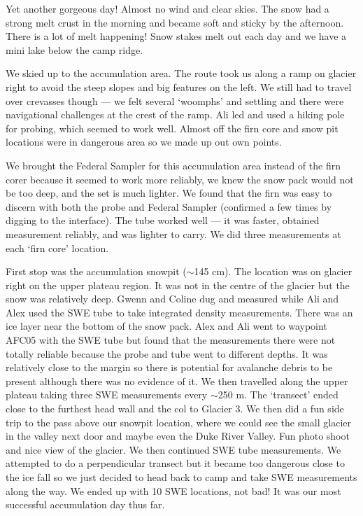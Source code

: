 \documentclass[12pt]{article}
\begin{document}
Yet another gorgeous day! Almost no wind and clear skies. The snow had a strong melt crust in the morning and became soft and sticky by the afternoon. There is a lot of melt happening! Snow stakes melt out each day and we have a mini lake below the camp ridge. 

We skied up to the accumulation area.  The route took us along a ramp on glacier right to avoid the steep slopes and big features on the left. We still had to travel over crevasses though --- we felt several `woomphs' and settling and there were navigational challenges at the crest of the ramp. Ali led and used a hiking pole for probing, which seemed to work well. Almost off the firn core and snow pit locations were in dangerous area so we made up out own points.

We brought the Federal Sampler for this accumulation area instead of the firn corer because it seemed to work more reliably, we knew the snow pack would not be too deep, and the set is much lighter.  We found that the firn was easy to discern with both the probe and Federal Sampler (confirmed a few times by digging to the interface). The tube worked well --- it was faster, obtained measurement reliably, and was lighter to carry. We did three measurements at each `firn core' location. 

First stop was the accumulation snowpit ($\sim$145 cm). The location was on glacier right on the upper plateau region. It was not in the centre of the glacier but the snow was relatively deep. Gwenn and Coline dug and measured while Ali and Alex used the SWE tube to take integrated density measurements. There was an ice layer near the bottom of the snow pack. Alex and Ali went to waypoint AFC05 with the SWE tube but found that the measurements there were not totally reliable because the probe and tube went to different depths. It was relatively close to the margin so there is potential for avalanche debris to be present although there was no evidence of it. We then travelled along the upper plateau taking three SWE measurements every $\sim$250 m. The `transect' ended close to the furthest head wall and the col to Glacier 3. We then did a fun side trip to the pass above our snowpit location, where we could see the small glacier in the valley next door and maybe even the Duke River Valley. Fun photo shoot and nice view of the glacier. We then continued SWE tube measurements. We attempted to do a perpendicular transect but it became too dangerous close to the ice fall so we just decided to head back to camp and take SWE measurements along the way. We ended up with 10 SWE locations, not bad! It was our most successful accumulation day thus far. 
\end{document}
